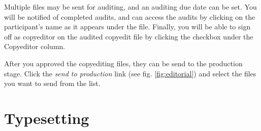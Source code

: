 Multiple files may be sent for auditing, and an auditing due date can be set. You will be notified of completed audits, and can access the audits by clicking on the participant's name as it appears under the file. Finally, you will be able to sign off as copyeditor on the audited copyedit file by clicking the checkbox under the Copyeditor column.

After you approved the copyediting files, they can be send to the production stage. Click the \textit{send to production} link (see fig. \ref{fig:editorial}) and select the files you want to send from the list.








\newpage


\section{Typesetting} 

